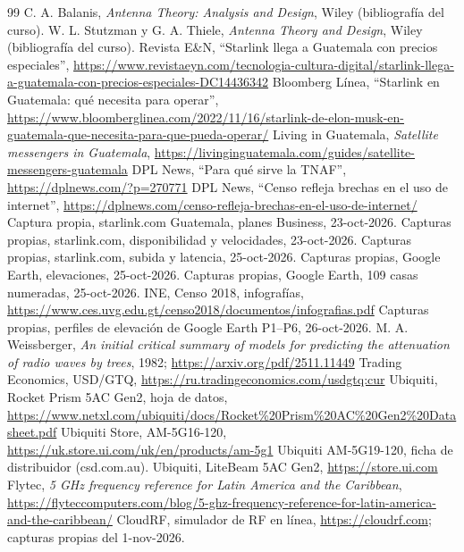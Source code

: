 \documentclass[11pt,a4paper]{article}
\begin{document}
\begin{thebibliography}{99}\footnotesize
{} C. A. Balanis, \textit{Antenna Theory: Analysis and Design}, Wiley (bibliografía del curso).
 W. L. Stutzman y G. A. Thiele, \textit{Antenna Theory and Design}, Wiley (bibliografía del curso).
 Revista E\&N, ``Starlink llega a Guatemala con precios especiales'', \url{https://www.revistaeyn.com/tecnologia-cultura-digital/starlink-llega-a-guatemala-con-precios-especiales-DC14436342}
 Bloomberg Línea, ``Starlink en Guatemala: qué necesita para operar'', \url{https://www.bloomberglinea.com/2022/11/16/starlink-de-elon-musk-en-guatemala-que-necesita-para-que-pueda-operar/}
 Living in Guatemala, \textit{Satellite messengers in Guatemala}, \url{https://livinginguatemala.com/guides/satellite-messengers-guatemala}
 DPL News, ``Para qué sirve la TNAF'', \url{https://dplnews.com/?p=270771}
 DPL News, ``Censo refleja brechas en el uso de internet'', \url{https://dplnews.com/censo-refleja-brechas-en-el-uso-de-internet/}
 Captura propia, starlink.com Guatemala, planes Business, 23-oct-2026.
 Capturas propias, starlink.com, disponibilidad y velocidades, 23-oct-2026.
 Capturas propias, starlink.com, subida y latencia, 25-oct-2026.
 Capturas propias, Google Earth, elevaciones, 25-oct-2026.
 Capturas propias, Google Earth, 109 casas numeradas, 25-oct-2026.
 INE, Censo 2018, infografías, \url{https://www.ces.uvg.edu.gt/censo2018/documentos/infografias.pdf}
 Capturas propias, perfiles de elevación de Google Earth P1--P6, 26-oct-2026.
 M. A. Weissberger, \textit{An initial critical summary of models for predicting the attenuation of radio waves by trees}, 1982; \url{https://arxiv.org/pdf/2511.11449}
 Trading Economics, USD/GTQ, \url{https://ru.tradingeconomics.com/usdgtq:cur}
 Ubiquiti, Rocket Prism 5AC Gen2, hoja de datos, \url{https://www.netxl.com/ubiquiti/docs/Rocket\%20Prism\%20AC\%20Gen2\%20Datasheet.pdf}
 Ubiquiti Store, AM-5G16-120, \url{https://uk.store.ui.com/uk/en/products/am-5g1}
 Ubiquiti AM-5G19-120, ficha de distribuidor (csd.com.au).
 Ubiquiti, LiteBeam 5AC Gen2, \url{https://store.ui.com}
 Flytec, \textit{5 GHz frequency reference for Latin America and the Caribbean}, \url{https://flyteccomputers.com/blog/5-ghz-frequency-reference-for-latin-america-and-the-caribbean/}
 CloudRF, simulador de RF en línea, \url{https://cloudrf.com}; capturas propias del 1-nov-2026.
\end{thebibliography}
\end{document}
